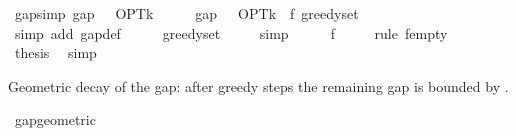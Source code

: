 \begin{isabellebody}
%
\isadelimproof
\isanewline
%
\endisadelimproof
\isanewline
{}\isamarkupfalse%
\ gap{\isacharunderscore}{\kern0pt}{}{\isacharbrackleft}{\kern0pt}simp{\isacharbrackright}{\kern0pt}{\isacharcolon}{\kern0pt}\ {\isachardoublequoteopen}gap\ {}\ {\isacharequal}{\kern0pt}\ OPT{\isacharunderscore}{\kern0pt}k{\isachardoublequoteclose}\isanewline
%
\isadelimproof
%
\endisadelimproof
%
\isatagproof
{}\isamarkupfalse%
\ {\isacharminus}{\kern0pt}\isanewline
\ \ \isamarkupfalse%
\ {\isachardoublequoteopen}gap\ {}\ {\isacharequal}{\kern0pt}\ OPT{\isacharunderscore}{\kern0pt}k\ {\isacharminus}{\kern0pt}\ f\ {\isacharparenleft}{\kern0pt}greedy{\isacharunderscore}{\kern0pt}set\ {}{\isacharparenright}{\kern0pt}{\isachardoublequoteclose}\isanewline
\ \ \ \ \isamarkupfalse%
\ {\isacharparenleft}{\kern0pt}simp\ add{\isacharcolon}{\kern0pt}\ gap{\isacharunderscore}{\kern0pt}def{\isacharparenright}{\kern0pt}\isanewline
\ \ \isamarkupfalse%
\ \isamarkupfalse%
\ {\isachardoublequoteopen}greedy{\isacharunderscore}{\kern0pt}set\ {}\ {\isacharequal}{\kern0pt}\ {\isacharbraceleft}{\kern0pt}{\isacharbraceright}{\kern0pt}{\isachardoublequoteclose}\ \isamarkupfalse%
\ simp\isanewline
\ \ \isamarkupfalse%
\ \isamarkupfalse%
\ {\isachardoublequoteopen}f\ {\isacharbraceleft}{\kern0pt}{\isacharbraceright}{\kern0pt}\ {\isacharequal}{\kern0pt}\ {}{\isachardoublequoteclose}\ \isamarkupfalse%
\ {\isacharparenleft}{\kern0pt}rule\ f{\isacharunderscore}{\kern0pt}empty{\isacharparenright}{\kern0pt}\isanewline
\ \ \isamarkupfalse%
\ \isamarkupfalse%
\ {\isacharquery}{\kern0pt}thesis\ \isamarkupfalse%
\ simp\isanewline
{}\isamarkupfalse%
%
\endisatagproof
{\isafoldproof}%
%
\isadelimproof
%
\endisadelimproof
%
\begin{isamarkuptext}%
Geometric decay of the gap: after  greedy steps the remaining gap is
  bounded by .%
\end{isamarkuptext}\isamarkuptrue%
\isamarkupfalse%
\ gap{\isacharunderscore}{\kern0pt}geometric{\isacharcolon}{\kern0pt}\isanewline

\end{isabellebody}
